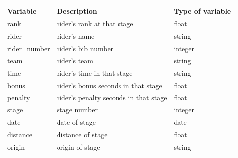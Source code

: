 \documentclass[aos,preprint]{imsart}
\begin{document}
\begin{table}[ht]
\centering
\begin{tabular}{lll}
\textbf{Variable} & \textbf{Description}                                                                                                  & \textbf{Type of variable} \\ \hline
rank              & rider's rank at that stage                                                                                            & float                     \\
rider             & rider's name                                                                                                          & string                    \\
rider\_number     & rider's bib number                                                                                                    & integer                   \\
team              & rider's team                                                                                                          & string                    \\
time              & rider's time in that stage                                                                                            & string                    \\
bonus             & rider's bonus seconds in that stage                                                                                   & float                     \\
penalty           & rider's penalty seconds in that stage                                                                                 & float                     \\
stage             & stage number                                                                                                          & integer                   \\
date              & date of stage                                                                                                         & date                      \\
distance          & distance of stage                                                                                                     & float                     \\
origin            & origin of stage                                                                                                       & string                    \\

\end{tabular}
\end{table}
\end{document}

